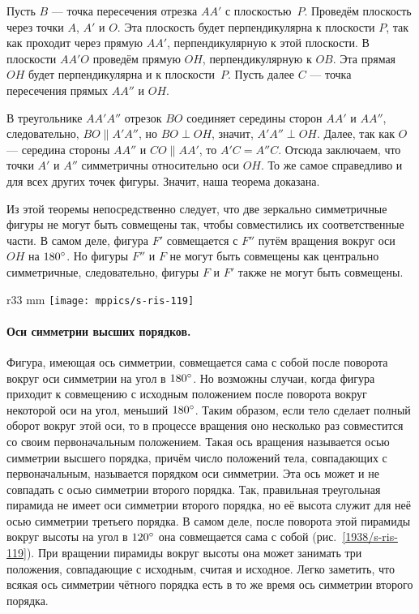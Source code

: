 Пусть $B$ — точка пересечения отрезка $AA'$ с плоскостью~$P$.
Проведём плоскость через точки $A$, $A'$ и $O$.
Эта плоскость будет перпендикулярна к плоскости $P$, так как проходит через прямую $AA'$, перпендикулярную к этой плоскости.
В плоскости $AA'O$ проведём прямую $OH$, перпендикулярную к $OB$.
Эта прямая $OH$ будет перпендикулярна и к плоскости~$P$.
Пусть далее $C$ — точка пересечения прямых $AA''$ и $OH$.

В треугольнике $AA'A''$ отрезок $BO$ соединяет середины сторон $AA'$ и $AA''$, следовательно, $BO\parallel A'A''$, но $BO\perp OH$, значит, $A'A''\perp OH$.
Далее, так как $O$ — середина стороны $AA''$ и $CO\parallel AA'$, то $A'C = A''C$.
Отсюда заключаем, что точки $A'$ и $A''$ симметричны относительно оси $OH$.
То же самое справедливо и для всех других точек фигуры.
Значит, наша теорема доказана.

Из этой теоремы непосредственно следует, что две зеркально симметричные фигуры не могут быть совмещены так, чтобы совместились их соответственные части.
В самом деле, фигура $F'$ совмещается с $F''$ путём вращения вокруг оси $OH$ на $180\degree$.
Но фигуры $F''$ и $F$ не могут быть совмещены как центрально симметричные, следовательно, фигуры $F$ и $F'$ также не могут быть совмещены.

\begin{wrapfigure}{r}{33 mm}
\vskip-0mm
\centering
\texttt{[image: mppics/s-ris-119]}
\caption{}\label{1938/s-ris-119}
\vskip-0mm
\end{wrapfigure}

\paragraph{Оси симметрии высших порядков.}\label{1938/s103}
Фигура, имеющая ось симметрии, совмещается сама с собой после поворота вокруг оси симметрии на угол в $180\degree$.
Но возможны случаи, когда фигура приходит к совмещению с исходным положением после поворота вокруг некоторой оси на угол, меньший $180\degree$.
Таким образом, если тело сделает полный оборот вокруг этой оси, то в процессе вращения оно несколько раз совместится со своим первоначальным положением.
Такая ось вращения называется осью симметрии высшего порядка, причём число положений тела, совпадающих с первоначальным, называется порядком оси симметрии.
Эта ось может и не совпадать с осью симметрии второго порядка.
Так, правильная треугольная пирамида не имеет оси симметрии второго порядка, но её высота служит для неё осью симметрии третьего порядка.
В самом деле, после поворота этой пирамиды вокруг высоты на угол в $120\degree$ она совмещается сама с собой (рис.~\ref{1938/s-ris-119}).
При вращении пирамиды вокруг высоты она может занимать три положения, совпадающие с исходным, считая и исходное.
Легко заметить, что всякая ось симметрии чётного порядка есть в то же время ось симметрии второго порядка.

